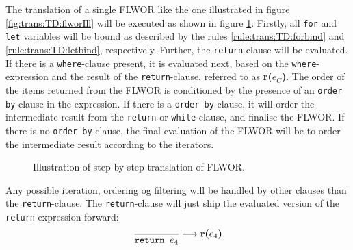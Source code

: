 The translation of a single FLWOR like the one illustrated in figure \ref{fig:trans:TD:flworIll} will be executed
as shown in figure \ref{fig:trans:TD:flworExecute}. Firstly, all \texttt{for} and \texttt{let} variables will be
bound as described by the rules \ref{rule:trans:TD:forbind} and \ref{rule:trans:TD:letbind}, respectively.
Further, the \texttt{return}-clause will be evaluated. If there is a \texttt{where}-clause present, it is
evaluated next, based on the \texttt{where}-expression and the result of the \texttt{return}-clause, referred to
as \textbf{r(}$e_{C}$\textbf{)}. The order of the items returned from the FLWOR is conditioned by the presence of
an \texttt{order by}-clause in the expression. If there is a \texttt{order by}-clause, it will order the
intermediate result from the \texttt{return} or \texttt{while}-clause, and finalise the FLWOR. If there is no
\texttt{order by}-clause, the final evaluation of the FLWOR will be to order the intermediate result according to
the iterators.

\begin{figure}[h]
\centering

\label{fig:trans:TD:flworExecute}
\caption[FLWOR translation order]{Illustration of step-by-step translation of FLWOR.}
\end{figure}



Any possible iteration, ordering og filtering will be handled by other clauses than the \texttt{return}-clause.
The \texttt{return}-clause will just ship the evaluated version of the \texttt{return}-expression forward:
\begin{equation}
\frac{}{\mbox{\texttt{return }}e_{4}}\longmapsto
\mbox{\textbf{r(}}e_{4}\mbox{\textbf{)}}
\label{rule:trans:TD:returnTaint}
\end{equation}


